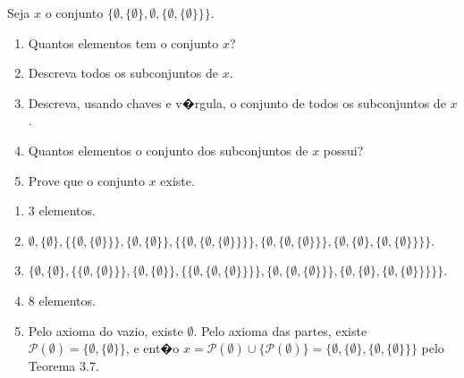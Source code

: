 \begin{exercicio}
	Seja $x$ o conjunto $\{\emptyset,\{\emptyset\},\emptyset,\{\emptyset,\{\emptyset\}\}\}$.
	\begin{enumerate}[label=(\alph{*})]
		\item Quantos elementos tem o conjunto $x$?
		\item Descreva todos os subconjuntos de $x$.
		\item Descreva, usando chaves e v�rgula, o conjunto de todos os subconjuntos de $x$.
		\item Quantos elementos o conjunto dos subconjuntos de $x$ possui?
		\item Prove que o conjunto $x$ existe.
	\end{enumerate}
\end{exercicio}
\begin{solucao}
	\begin{enumerate}[label=(\alph{*})]
		\item 3 elementos.
		\item $\emptyset,\{\emptyset\},\{\{\emptyset,\{\emptyset\}\}\},\{\emptyset,\{\emptyset\}\},\{\{\emptyset,\{\emptyset,\{\emptyset\}\}\}\},\{\emptyset,\{\emptyset,\{\emptyset\}\}\},\{\emptyset,\{\emptyset\},\{\emptyset,\{\emptyset\}\}\}\}$.
		\item $\{\emptyset,\{\emptyset\},\{\{\emptyset,\{\emptyset\}\}\},\{\emptyset,\{\emptyset\}\},\{\{\emptyset,\{\emptyset,\{\emptyset\}\}\}\},\{\emptyset,\{\emptyset,\{\emptyset\}\}\},\{\emptyset,\{\emptyset\},\{\emptyset,\{\emptyset\}\}\}\}\}$.
		\item 8 elementos.
		\item Pelo axioma do vazio, existe $\emptyset$. Pelo axioma das partes, existe $\mathcal{P}(\emptyset)=\{\emptyset,\{\emptyset\}\}$, e ent�o $x=\mathcal{P}(\emptyset)\cup\{\mathcal{P}(\emptyset)\}=\{\emptyset,\{\emptyset\},\{\emptyset,\{\emptyset\}\}\}$ pelo Teorema 3.7.
	\end{enumerate}
\end{solucao}

